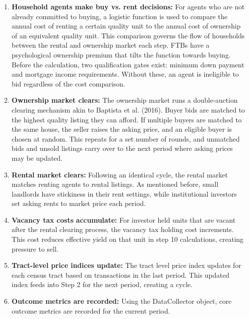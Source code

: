 \documentclass[twocolumn,showpacs,%
  nofootinbib,aps,superscriptaddress,%
  eqsecnum,prd,notitlepage,showkeys,10pt]{revtex4-1}
\begin{document}
\begin{enumerate}
    \item \textbf{Household agents make buy vs. rent decisions: } For agents who are not already committed to buying, a logistic function is used to compare the annual cost of renting a certain quality unit to the annual cost of ownership of an equivalent quality unit. This comparison governs the flow of households between the rental and ownership market each step. FTBs have a psychological ownership premium that tilts the function towards buying. Before the calculation, two qualification gates exist: minimum down payment and mortgage income requirements. Without these, an agent is ineligible to bid regardless of the cost comparison. 

    \item \textbf{Ownership market clears: } The ownership market runs a double-auction clearing mechanism akin to Baptista et al. (2016). Buyer bids are matched to the highest quality listing they can afford. If multiple buyers are matched to the same house, the seller raises the asking price, and an eligible buyer is chosen at random. This repeats for a set number of rounds, and unmatched bids and unsold listings carry over to the next period where asking prices may be updated. 

    \item \textbf{Rental market clears: } Following an identical cycle, the rental market matches renting agents to rental listings. As mentioned before, small landlords have stickiness in their rent settings, while institutional investors set asking rents to market price each period.

    \item \textbf{Vacancy tax costs accumulate:} For investor held units that are vacant after the rental clearing process, the vacancy tax holding cost increments. This cost reduces effective yield on that unit in step 10 calculations, creating pressure to sell. 

    \item \textbf{Tract-level price indices update: } The tract level price index updates for each census tract based on transactions in the last period. This updated index feeds into Step 2 for the next period, creating a cycle. 

    \item \textbf{Outcome metrics are recorded: } Using the DataCollector object, core outcome metrics are recorded for the current period. 
    
\end{enumerate}
\end{document}
